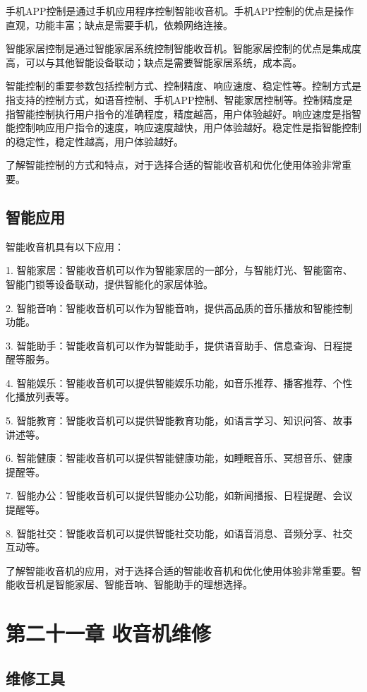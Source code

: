 \documentclass[12pt,UTF8]{ctexbook}
\begin{document}
手机APP控制是通过手机应用程序控制智能收音机。手机APP控制的优点是操作直观，功能丰富；缺点是需要手机，依赖网络连接。

智能家居控制是通过智能家居系统控制智能收音机。智能家居控制的优点是集成度高，可以与其他智能设备联动；缺点是需要智能家居系统，成本高。

智能控制的重要参数包括控制方式、控制精度、响应速度、稳定性等。控制方式是指支持的控制方式，如语音控制、手机APP控制、智能家居控制等。控制精度是指智能控制执行用户指令的准确程度，精度越高，用户体验越好。响应速度是指智能控制响应用户指令的速度，响应速度越快，用户体验越好。稳定性是指智能控制的稳定性，稳定性越高，用户体验越好。

了解智能控制的方式和特点，对于选择合适的智能收音机和优化使用体验非常重要。

\section{智能应用}

智能收音机具有以下应用：

1. 智能家居：智能收音机可以作为智能家居的一部分，与智能灯光、智能窗帘、智能门锁等设备联动，提供智能化的家居体验。

2. 智能音响：智能收音机可以作为智能音响，提供高品质的音乐播放和智能控制功能。

3. 智能助手：智能收音机可以作为智能助手，提供语音助手、信息查询、日程提醒等服务。

4. 智能娱乐：智能收音机可以提供智能娱乐功能，如音乐推荐、播客推荐、个性化播放列表等。

5. 智能教育：智能收音机可以提供智能教育功能，如语言学习、知识问答、故事讲述等。

6. 智能健康：智能收音机可以提供智能健康功能，如睡眠音乐、冥想音乐、健康提醒等。

7. 智能办公：智能收音机可以提供智能办公功能，如新闻播报、日程提醒、会议提醒等。

8. 智能社交：智能收音机可以提供智能社交功能，如语音消息、音频分享、社交互动等。

了解智能收音机的应用，对于选择合适的智能收音机和优化使用体验非常重要。智能收音机是智能家居、智能音响、智能助手的理想选择。

\chapter{第二十一章 收音机维修}

\section{维修工具}
\end{document}
